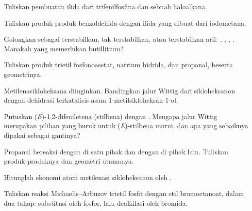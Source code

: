 \begin{exercise}[$\star$]\label{exo:b2:wittig:1}
Tuliskan pembuatan ilida  dari trifenilfosfina dan sebuah haloalkana.
\end{exercise}

\begin{exercise}[$\star$]\label{exo:b2:wittig:2}
Tuliskan produk-produk  benzaldehida dengan ilida yang dibuat dari iodometana.
\end{exercise}

\begin{exercise}[$\star$]\label{exo:b2:wittig:3}
Golongkan sebagai terstabilkan, tak terstabilkan, atau terstabilkan aril:
, ,
, . Manakah yang memerlukan butillitium?
\end{exercise}

\begin{exercise}[$\star$]\label{exo:b2:wittig:4}
Tuliskan produk trietil fosfonoasetat, natrium hidrida, dan propanal, beserta geometrinya.
\end{exercise}

\begin{exercise}[$\star\star$]\label{exo:b2:wittig:5}
Metilenasikloheksana diinginkan. Bandingkan jalur Wittig dari sikloheksanon
dengan dehidrasi terkatalisis asam 1-metilsikloheksan-1-ol.
\end{exercise}

\begin{exercise}[$\star\star$]\label{exo:b2:wittig:6}
Putuskan (\textit{E})-1,2-difeniletena (stilbena) dengan .
Mengapa jalur Wittig merupakan pilihan yang buruk untuk (\textit{E})-stilbena
murni, dan apa yang sebaiknya dipakai sebagai gantinya?
\end{exercise}

\begin{exercise}[$\star\star$]\label{exo:b2:wittig:7}
Propanal bereaksi dengan  di satu pihak dan dengan
 di pihak lain. Tuliskan produk-produknya dan geometri
utamanya.
\end{exercise}

\begin{exercise}[$\star\star$]\label{exo:b2:wittig:8}
Hitunglah ekonomi atom metilenasi sikloheksanon oleh .
\end{exercise}

\begin{exercise}[$\star\star$]\label{exo:b2:wittig:9}
Tuliskan reaksi Michaelis--Arbuzov trietil fosfit dengan etil bromoetanoat,
dalam dua tahap: substitusi oleh fosfor, lalu dealkilasi oleh bromida.
\end{exercise}

